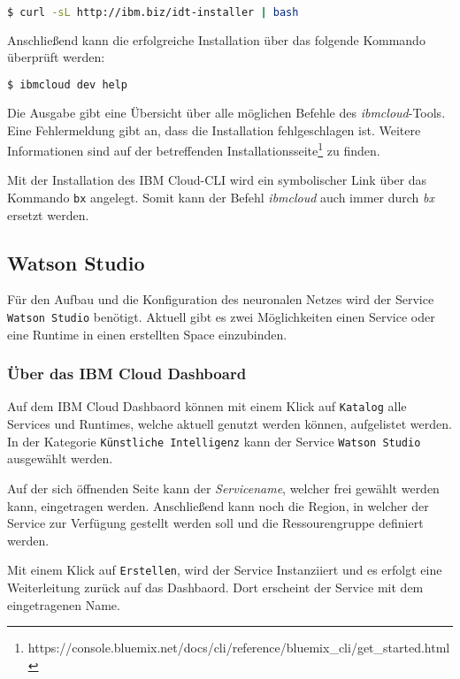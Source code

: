 \begin{lstlisting}[language=bash, caption=Installation des IBM Cloud CLI, label=Installation des IBM Cloud CLI]
    $ curl -sL http://ibm.biz/idt-installer | bash
\end{lstlisting}

Anschließend kann die erfolgreiche Installation über das folgende Kommando überprüft werden:

\begin{lstlisting}[language=bash, caption=Installation des CLI überprüfen, label=Installation des CLI überprüfen]
    $ ibmcloud dev help
\end{lstlisting}

Die Ausgabe gibt eine Übersicht über alle möglichen Befehle des \textit{ibmcloud}-Tools. Eine Fehlermeldung gibt an, dass
die Installation fehlgeschlagen ist. Weitere Informationen sind auf der betreffenden
Installationsseite\footnote{https://console.bluemix.net/docs/cli/reference/bluemix\_cli/get\_started.html} zu finden.

Mit der Installation des IBM Cloud-CLI wird ein symbolischer Link über das Kommando \texttt{bx} angelegt. Somit kann der
Befehl \textit{ibmcloud} auch immer durch \textit{bx} ersetzt werden.

\subsection{Watson Studio}
Für den Aufbau und die Konfiguration des neuronalen Netzes wird der Service \texttt{Watson Studio} benötigt. Aktuell gibt
es zwei Möglichkeiten einen Service oder eine Runtime in einen erstellten Space einzubinden.

\subsubsection*{Über das IBM Cloud Dashboard}
Auf dem IBM Cloud Dashbaord können mit einem Klick auf \texttt{Katalog} alle Services und Runtimes, welche aktuell genutzt
werden können, aufgelistet werden. In der Kategorie \texttt{Künstliche Intelligenz} kann der Service \texttt{Watson Studio}
ausgewählt werden.

Auf der sich öffnenden Seite kann der \textit{Servicename}, welcher frei gewählt werden kann, eingetragen werden.
Anschließend kann noch die Region, in welcher der Service zur Verfügung gestellt werden soll und die Ressourengruppe
definiert werden.

Mit einem Klick auf \texttt{Erstellen}, wird der Service Instanziiert und es erfolgt eine Weiterleitung zurück auf das
Dashbaord. Dort erscheint der Service mit dem eingetragenen Name.

